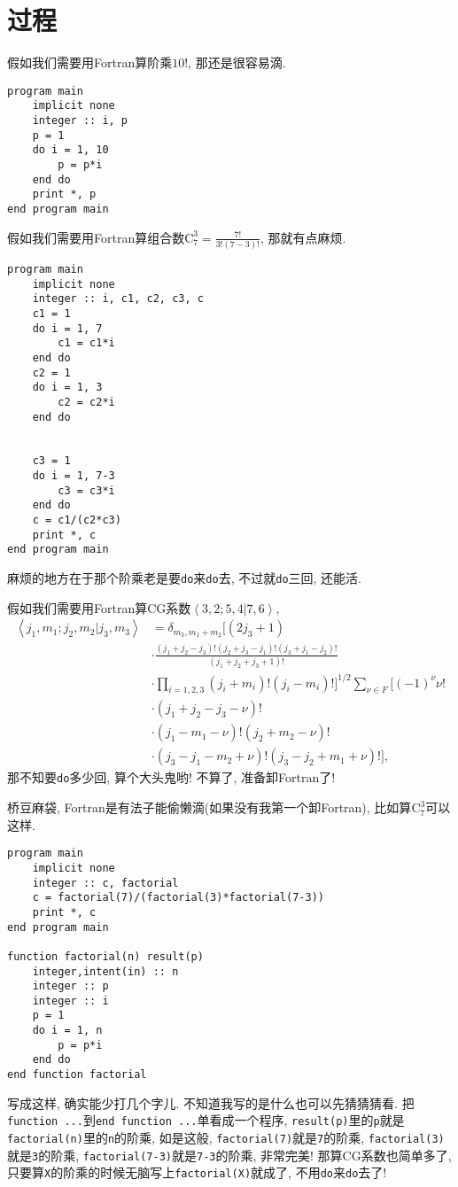 \chapter{过程}\label{fortran_procedure}

假如我们需要用Fortran算阶乘$10!$, 那还是很容易滴.
\begin{verbatim}
program main
    implicit none
    integer :: i, p
    p = 1
    do i = 1, 10
        p = p*i
    end do
    print *, p
end program main
\end{verbatim}

假如我们需要用Fortran算组合数$\text{C}_7^3=\frac{7!}{3!(7-3)!}$, 那就有点麻烦.
\begin{verbatim}
program main
    implicit none
    integer :: i, c1, c2, c3, c
    c1 = 1
    do i = 1, 7
        c1 = c1*i
    end do
    c2 = 1
    do i = 1, 3
        c2 = c2*i
    end do


    c3 = 1
    do i = 1, 7-3
        c3 = c3*i
    end do
    c = c1/(c2*c3)
    print *, c
end program main
\end{verbatim}
麻烦的地方在于那个阶乘老是要\verb|do|来\verb|do|去, 不过就\verb|do|三回, 还能活.

假如我们需要用Fortran算CG系数$\left\langle 3,2;5,4|7,6\right\rangle $,
\begin{align*}
    \left\langle j_1,m_1;j_2,m_2|j_3,m_3\right\rangle&=\delta_{m_3,m_1+m_2}\Big[(2j_3+1)\\
    &\cdot\frac{(j_1+j_2-j_3)!(j_2+j_3-j_1)!(j_3+j_1-j_2)!}{(j_1+j_2+j_3+1)!}
    \\
    &\cdot\prod_{i=1,2,3}(j_i+m_i)!(j_i-m_i)!\Big]^{1/2}\sum_{\nu\in F}[(-1)^{\nu}\nu!\\
    &\cdot(j_1+j_2-j_3-\nu)!\\
    &\cdot(j_1-m_1-\nu)!(j_2+m_2-\nu)!\\
    &\cdot(j_3-j_1-m_2+\nu)!(j_3-j_2+m_1+\nu)!],
\end{align*}
那不知要\verb|do|多少回, 算个大头鬼哟! 不算了, 准备卸Fortran了!

桥豆麻袋, Fortran是有法子能偷懒滴(如果没有我第一个卸Fortran), 比如算$\text{C}_7^3$可以这样.
\begin{verbatim}
program main
    implicit none
    integer :: c, factorial
    c = factorial(7)/(factorial(3)*factorial(7-3))
    print *, c
end program main

function factorial(n) result(p)
    integer,intent(in) :: n
    integer :: p
    integer :: i 
    p = 1
    do i = 1, n
        p = p*i
    end do
end function factorial
\end{verbatim}
写成这样, 确实能少打几个字儿. 不知道我写的是什么也可以先猜猜猜看. 把\verb|function ...|到\verb|end function ...|单看成一个程序, \verb|result(p)|里的\verb|p|就是\verb|factorial(n)|里的\verb|n|的阶乘, 如是这般, \verb|factorial(7)|就是\verb|7|的阶乘, \verb|factorial(3)|就是\verb|3|的阶乘, \verb|factorial(7-3)|就是\verb|7-3|的阶乘, 非常完美! 那算CG系数也简单多了, 只要算\verb|X|的阶乘的时候无脑写上\verb|factorial(X)|就成了, 不用\verb|do|来\verb|do|去了!

